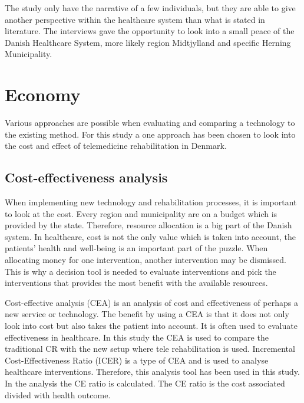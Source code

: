 The study only have the narrative of a few individuals, but they are able to give another perspective within the healthcare system than what is stated in literature. The interviews gave the opportunity to look into a small peace of the Danish Healthcare System, more likely region Midtjylland and specific Herning Municipality. 




\section{Economy}


Various approaches are possible when evaluating and comparing a technology to the existing method. For this study a one approach has been chosen to look into the cost and effect of telemedicine rehabilitation in Denmark.

\subsection{Cost-effectiveness analysis}

When implementing new technology and rehabilitation processes, it is important to look at the cost. Every region and municipality are on a budget which is provided by the state. Therefore, resource allocation is a big part of the Danish system. In healthcare, cost is not the only value which is taken into account, the patients’ health and well-being is an important part of the puzzle. When allocating money for one intervention, another intervention may be dismissed. This is why a decision tool is needed to evaluate interventions and pick the interventions that provides the most benefit with the available resources.

Cost-effective analysis (CEA) is an analysis of cost and effectiveness of perhaps a new service or technology. The benefit by using a CEA is that it does not only look into cost but also takes the patient into account. It is often used to evaluate effectiveness in healthcare. In this study the CEA is used to compare the traditional CR with the new setup where tele rehabilitation is used. Incremental Cost-Effectiveness Ratio (ICER) is a type of CEA and is used to analyse healthcare interventions. Therefore, this analysis tool has been used in this study. In the analysis the CE ratio is calculated. The CE ratio is the cost associated divided with health outcome.

